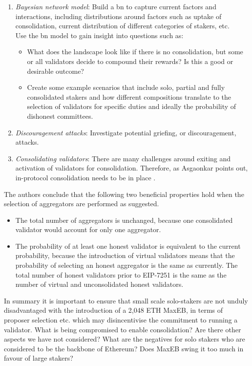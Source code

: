 \documentclass[UTF8]{article}
\begin{document}
\begin{enumerate}
\item \textit{Bayesian network model}: Build a \gls{bn} to capture current factors and interactions, including distributions around factors such as uptake of consolidation, current distribution of different categories of stakers, etc. \\
Use the \gls{bn} model to gain insight into questions such as:
	\begin{itemize}
	\item What does the landscape look like if there is no consolidation, but some or all validators decide to compound their rewards? Is this a good or desirable outcome? 
	\item Create some example scenarios that include solo, partial and fully consolidated stakers and how different compositions translate to the selection of validators for specific duties and ideally the probability of dishonest committees.
	\end{itemize}

\item \textit{Discouragement attacks}: Investigate potential griefing, or discouragement, attacks.

\item \textit{Consolidating validators}: There are many challenges around exiting and activation of validators for consolidation. Therefore, as Asgaonkar points out, in-protocol consolidation needs to be in place \cite{Asgaonkar2023}.
 
\end{enumerate}

The authors conclude that the following two beneficial properties hold when the selection of aggregators are performed as suggested.

\begin{itemize}
\item The total number of aggregators is unchanged, because one consolidated validator would account for only one aggregator.
\item The probability of at least one honest validator is equivalent to the current probability, because the introduction of virtual validators means that the probability of selecting an honest aggregator is the same as currently. The total number of honest validators prior to EIP-7251 is the same as the number of virtual and unconsolidated honest validators.
\end{itemize}


In summary it is important to ensure that small scale solo-stakers are not unduly disadvantaged with the introduction of a 2,048 ETH MaxEB, in terms of proposer selection etc. which may disincentivise the commitment to running a validator. What is being compromised to enable consolidation? Are there other aspects we have not considered? What are the negatives for solo stakers who are considered to be the backbone of Ethereum? Does MaxEB swing it too much in favour of large stakers?
\end{document}
